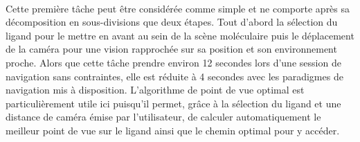 \\

Cette première tâche peut être considérée comme simple et ne comporte après sa décomposition en sous-divisions que deux étapes. Tout d'abord la sélection du ligand pour le mettre en avant au sein de la scène moléculaire puis le déplacement de la caméra pour une vision rapprochée sur sa position et son environnement proche. Alors que cette tâche prendre environ 12 secondes lors d'une session de navigation sans contraintes, elle est réduite à 4 secondes avec les paradigmes de navigation mis à disposition. L'algorithme de point de vue optimal est particulièrement utile ici puisqu'il permet, grâce à la sélection du ligand et une distance de caméra émise par l'utilisateur, de calculer automatiquement le meilleur point de vue sur le ligand ainsi que le chemin optimal pour y accéder.

